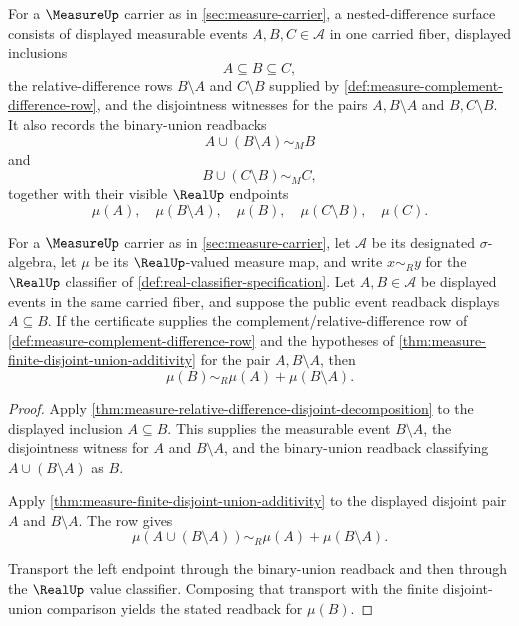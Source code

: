 \begin{definition}
\label{def:measure-nested-difference-surface}
For a $\MeasureUp$ carrier as in \autoref{sec:measure-carrier}, a
nested-difference surface consists of displayed measurable events
$A,B,C\in\mathcal{A}$ in one carried fiber, displayed inclusions
$$
A\subseteq B\subseteq C,
$$
the relative-difference rows $B\setminus A$ and $C\setminus B$ supplied by
\autoref{def:measure-complement-difference-row}, and the disjointness witnesses
for the pairs $A,B\setminus A$ and $B,C\setminus B$. It also records the
binary-union readbacks
$$
A\cup(B\setminus A)\sim_M B
$$
and
$$
B\cup(C\setminus B)\sim_M C,
$$
together with their visible $\RealUp$ endpoints
$$
\mu(A),\quad \mu(B\setminus A),\quad \mu(B),\quad
\mu(C\setminus B),\quad \mu(C).
$$
\end{definition}

\begin{theorem}
\label{thm:measure-nested-difference-readback}
For a $\MeasureUp$ carrier as in \autoref{sec:measure-carrier}, let
$\mathcal{A}$ be its designated $\sigma$-algebra, let $\mu$ be its
$\RealUp$-valued measure map, and write $x\sim_R y$ for the $\RealUp$
classifier of \autoref{def:real-classifier-specification}. Let
$A,B\in\mathcal{A}$ be displayed events in the same carried fiber, and suppose
the public event readback displays $A\subseteq B$. If the certificate supplies
the complement/relative-difference row of
\autoref{def:measure-complement-difference-row} and the hypotheses of
\autoref{thm:measure-finite-disjoint-union-additivity} for the pair
$A,B\setminus A$, then
$$
\mu(B)\sim_R\mu(A)+\mu(B\setminus A).
$$
\end{theorem}
\begin{proof}
Apply \autoref{thm:measure-relative-difference-disjoint-decomposition} to the
displayed inclusion $A\subseteq B$. This supplies the measurable event
$B\setminus A$, the disjointness witness for $A$ and $B\setminus A$, and the
binary-union readback classifying $A\cup(B\setminus A)$ as $B$.

Apply \autoref{thm:measure-finite-disjoint-union-additivity} to the displayed
disjoint pair $A$ and $B\setminus A$. The row gives
$$
\mu(A\cup(B\setminus A))\sim_R\mu(A)+\mu(B\setminus A).
$$

Transport the left endpoint through the binary-union readback and then through
the $\RealUp$ value classifier. Composing that transport with the finite
disjoint-union comparison yields the stated readback for $\mu(B)$.
\end{proof}

